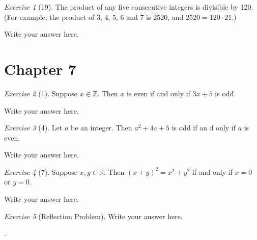 \documentclass[12pt]{amsart}
\makeatletter
\theoremstyle{remark}
\newtheorem*{exercise}{Exercise}%
\def\RR{\ensuremath{\mathbb R}}
\def\ZZ{\ensuremath{\mathbb Z}}
\renewenvironment{proof}[1][\proofname]{\par\doublespacing
  \pushQED{\qed}%
  \normalfont \topsep6\p@\@plus6\p@\relax
  \list{}{%
    \settowidth{\leftmargin}{\itshape\proofname:\hskip\labelsep}%
    \setlength{\labelwidth}{0pt}%
    \setlength{\itemindent}{-\leftmargin}%
  }%
  \item[\hskip\labelsep\itshape#1\@addpunct{:}]\ignorespaces
}{%
  \popQED\endlist\@endpefalse
  \singlespacing
}
\theoremstyle{mycomment}
\makeatother
\begin{document}
\begin{exercise}[19] The product of any five consecutive integers is divisible by 120. (For example, the product of 3, 4, 5, 6 and 7 is 2520, and $2520=120\cdot 21$.)
\begin{proof}
Write your answer here.
\end{proof}
\end{exercise}

\section*{Chapter 7}
\begin{exercise}[1] Suppose $x\in\ZZ$. Then $x$ is even if and only if $3x+5$ is odd.
\begin{proof}
Write your answer here.
\end{proof}
\end{exercise}
\begin{exercise}[4] Let $a$ be an integer. Then $a^{2}+4a+5$ is odd if an d only if $a$ is even.
\begin{proof}
Write your answer here.
\end{proof}
\end{exercise}
\begin{exercise}[7] Suppose $x,y\in\RR$. Then $(x+y)^{2}=x^{2}+y^{2}$ if and only if $x=0$ or $y=0$.
\begin{proof}
Write your answer here.
\end{proof}
\end{exercise}

\begin{exercise}[Reflection Problem]
\begin{proof}
Write your answer here.
\end{proof}
\end{exercise}.















 
\end{document}
